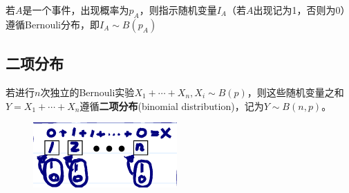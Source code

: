 \begin{remark}
    若$A$是一个事件，出现概率为$p_A$，则指示随机变量$I_A$（若$A$出现记为1，否则为0）遵循Bernouli分布，即$I_A \sim B(p_A)$
\end{remark}

\subsection{二项分布}

\begin{definition}[二项分布]
    若进行$n$次独立的Bernouli实验$X_1+\cdots+X_n, X_i \sim B(p)$，则这些随机变量之和$Y=X_1+\cdots+X_n$遵循\textbf{二项分布}(binomial distribution)，记为$Y \sim B(n,p)$。
\end{definition}

\begin{figure}[h]
    \centering
    \includegraphics{image/binomail_dist.png}
\end{figure}

